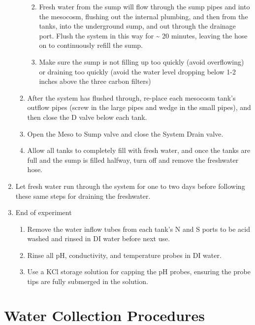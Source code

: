 \documentclass[
]{book}
\providecommand{\tightlist}{%
  \setlength{\itemsep}{0pt}\setlength{\parskip}{0pt}}
\begin{document}
\begin{enumerate}
\begin{enumerate}
    \begin{enumerate}
    \def\labelenumiii{\arabic{enumiii}.}
    \tightlist
    \item
      Fresh water from the sump will flow through the sump pipes and into the mesocosm, flushing out the internal plumbing, and then from the tanks, into the underground sump, and out through the drainage port. Flush the system in this way for \textasciitilde{} 20 minutes, leaving the hose on to continuously refill the sump.
    \item
      Make sure the sump is not filling up too quickly (avoid overflowing) or draining too quickly (avoid the water level dropping below 1-2 inches above the three carbon filters)
    \end{enumerate}
  \item
    After the system has flushed through, re-place each mesocosm tank's outflow pipes (screw in the large pipes and wedge in the small pipes), and then close the D valve below each tank.
  \item
    Open the Meso to Sump valve and close the System Drain valve.
  \item
    Allow all tanks to completely fill with fresh water, and once the tanks are full and the sump is filled halfway, turn off and remove the freshwater hose.
  \end{enumerate}
\item
  Let fresh water run through the system for one to two days before following these same steps for draining the freshwater.
\item
  End of experiment

  \begin{enumerate}
  \def\labelenumii{\arabic{enumii}.}
  \tightlist
  \item
    Remove the water inflow tubes from each tank's N and S ports to be acid washed and rinsed in DI water before next use.
  \item
    Rinse all pH, conductivity, and temperature probes in DI water.
  \item
    Use a KCl storage solution for capping the pH probes, ensuring the probe tips are fully submerged in the solution.
  \end{enumerate}
\end{enumerate}

\hypertarget{water-collection-procedures}{%
\chapter{Water Collection Procedures}\label{water-collection-procedures}}
\end{document}
